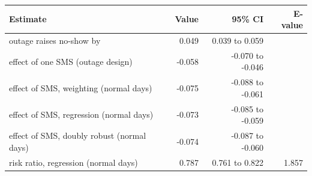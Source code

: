 \begin{tabular}{lrrr}
\toprule
Estimate & Value & 95\% CI & E-value \\
\midrule
outage raises no-show by & 0.049 & 0.039 to 0.059 &  \\
effect of one SMS (outage design) & -0.058 & -0.070 to -0.046 &  \\
effect of SMS, weighting (normal days) & -0.075 & -0.088 to -0.061 &  \\
effect of SMS, regression (normal days) & -0.073 & -0.085 to -0.059 &  \\
effect of SMS, doubly robust (normal days) & -0.074 & -0.087 to -0.060 &  \\
risk ratio, regression (normal days) & 0.787 & 0.761 to 0.822 & 1.857 \\
\bottomrule
\end{tabular}

